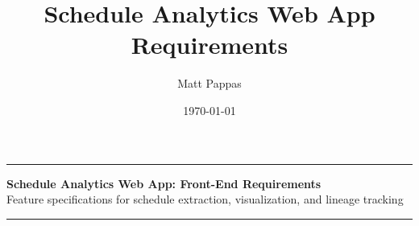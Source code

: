 \documentclass[10pt, a4paper]{article}
\title{Schedule Analytics Web App Requirements}
\author{Matt Pappas}
\date{\today}
\begin{document}
\pagestyle{plain}
\renewcommand{\thepage}{\arabic{page}}
\thispagestyle{plain}

\begin{center}
    \noindent\rule{\linewidth}{1.5pt}
    
    \vspace{0.05em}
    
    {\large \textbf{Schedule Analytics Web App: Front-End Requirements}} \\[0.05em]
    {\footnotesize Feature specifications for schedule extraction, visualization, and lineage tracking}
    
    \vspace{0.05em}
    
    \noindent\rule{\linewidth}{1.5pt}
\end{center}

\vspace{0.1em}

\end{document}

